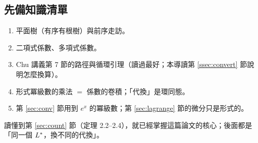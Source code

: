 \subsection*{先備知識清單}
\begin{enumerate}
  \item 平面樹（有序有根樹）與前序走訪。
  \item 二項式係數、多項式係數。
  \item Chu 講義第 7 節的路徑與循環引理（讀過最好；本導讀第 \ref{ssec:convert} 節說明怎麼換算）。
  \item 形式冪級數的乘法 $=$ 係數的卷積；「代換」是環同態。
  \item 第 \ref{sec:conv} 節用到 $e^x$ 的冪級數；第 \ref{sec:lagrange} 節的微分只是形式的。
\end{enumerate}
讀懂到第 \ref{sec:count} 節（定理 2.2--2.4），就已經掌握這篇論文的核心；後面都是「同一個 $L^{*}$，換不同的代換」。
